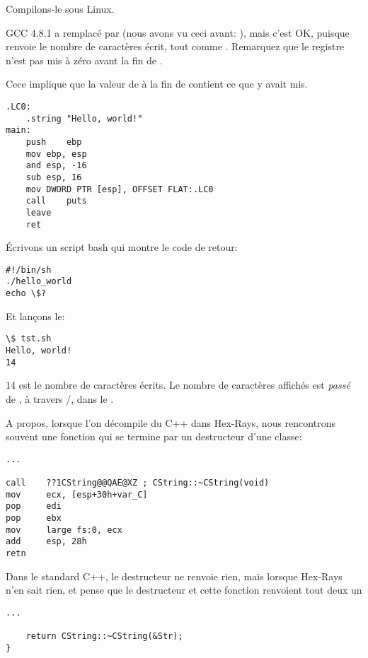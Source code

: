Compilons-le sous Linux.

GCC 4.8.1 a remplacé \printf par \puts (nous avons vu ceci avant: ),
mais c'est OK, puisque \puts renvoie le nombre de caractères écrit, tout comme
\printf.
Remarquez que le registre \EAX n'est pas mis à zéro avant la fin de \main.

Cece implique que la valeur de \EAX à la fin de \main contient ce que \puts y avait mis.

\begin{lstlisting}[caption=GCC 4.8.1,style=customasmx86]
.LC0:
	.string	"Hello, world!"
main:
	push	ebp
	mov	ebp, esp
	and	esp, -16
	sub	esp, 16
	mov	DWORD PTR [esp], OFFSET FLAT:.LC0
	call	puts
	leave
	ret
\end{lstlisting}


Écrivons un script bash qui montre le code de retour:

\begin{lstlisting}[caption=tst.sh]
#!/bin/sh
./hello_world
echo \$?
\end{lstlisting}

Et lançons le:

\begin{lstlisting}
\$ tst.sh 
Hello, world!
14
\end{lstlisting}

14 est le nombre de caractères écrits.
Le nombre de caractères affichés est \textit{passé} de \printf{}, à travers /, dans le .

A propos, lorsque l'on décompile du C++ dans Hex-Rays, nous rencontrons souvent
une fonction qui se termine par un destructeur d'une classe:

\begin{lstlisting}[style=customasmx86]
...

call    ??1CString@@QAE@XZ ; CString::~CString(void)
mov     ecx, [esp+30h+var_C]
pop     edi
pop     ebx
mov     large fs:0, ecx
add     esp, 28h
retn
\end{lstlisting}

Dans le standard C++, le destructeur ne renvoie rien, mais lorsque Hex-Rays n'en %
sait rien, et pense que le destructeur et cette fonction renvoient tout deux un \Tint

\begin{lstlisting}[style=customc]
...

	return CString::~CString(&Str);
}
\end{lstlisting}

